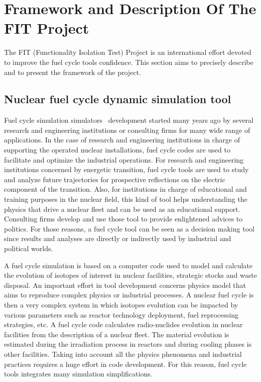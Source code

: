 \section{Framework and Description Of The FIT Project}

The FIT (Functionality Isolation Test) Project is an international effort
devoted to improve the fuel cycle tools confidence. This section aims to
precisely describe and to present the framework of the project.

\subsection{Nuclear fuel cycle dynamic simulation tool}

Fuel cycle simulation simulators~\cite{NEA2016} development started many years
ago by several research and engineering institutions or consulting firms for
many wide range of applications. In the case of research and engineering
institutions in charge of supporting the operated nuclear installations, fuel
cycle codes are used to facilitate and  optimize the industrial operations. For
research and engineering institutions concerned by energetic transition, fuel
cycle tools are used to study and analyze future trajectories for prospective
reflections on the electric component of the transition. Also, for institutions
in charge of educational and training purposes in the nuclear field, this kind
of tool helps understanding the physics that drive a nuclear fleet and can be
used as an educational support. Consulting firms develop and use those tool to
provide enlightened advices to politics. For those reasons, a fuel cycle tool
can be seen as a decision making tool since results and analyses are directly or
indirectly used by industrial and political worlds.

A fuel cycle simulation is based on a computer code used to model and calculate
the evolution of isotopes of interest in nuclear facilities, strategic stocks
and waste disposal. An important effort in tool development concerns physics
model that aims to reproduce complex physics or industrial processes. A nuclear
fuel cycle is then a very complex system in which isotopes evolution can be
impacted by various parameters such as reactor technology deployment, fuel
reprocessing strategies, etc. A fuel cycle code calculates radio-nuclides
evolution in nuclear facilities from the description of a nuclear fleet. The
material evolution is estimated during the irradiation process in reactors and
during cooling phases is other facilities. Taking into account all the physics
phenomena and industrial practices requires a huge effort in code development.
For this reason, fuel cycle tools integrates many simulation simplifications.

